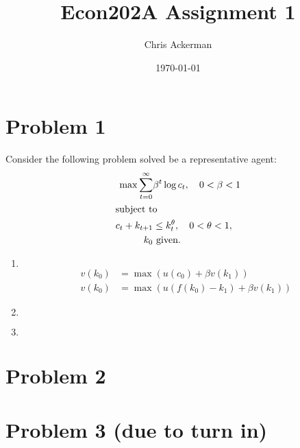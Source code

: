 \documentclass[11pt]{article}
\author{Chris Ackerman}
\date{\today}
\title{Econ202A Assignment 1}
\begin{document}
\maketitle
\tableofcontents

\newpage
\section{Problem 1}
\label{sec:orgde1cf18}
Consider the following problem solved be a representative agent:
  \begin{align*}
  \max \sum^\infty_{t = 0} &\beta^t \log c_t, \quad 0 < \beta < 1\\
\intertext{subject to}
c_t + k_{t + 1} &\le k^\theta_t, \quad 0 < \theta < 1,\\
k_0 &\text{ given.}
  \end{align*}
  \begin{enumerate}[label=(\alph*)]
    \item $ $
    \begin{align*}
    v(k_0) &= \max(u(c_0) + \beta v(k_1))\\
v(k_0) &= \max(u(f(k_0) - k_1) + \beta v(k_1))
\end{align*}
    \item $ $ 
    \item $ $
  \end{enumerate}


\newpage
\section{Problem 2}
\label{sec:org82049a7}

\newpage
\section{Problem 3 (due to turn in)}
\label{sec:org2e3da68}
\end{document}
